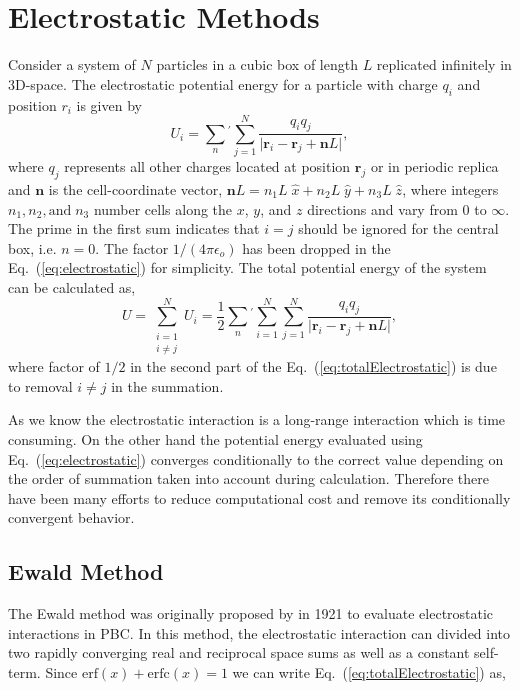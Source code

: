 \section{Electrostatic Methods}
\label{sec:ElectMethod}
Consider a system of $N$ particles in a cubic box of length $L$  replicated infinitely in 3D-space. The electrostatic potential energy for a particle with charge $q_i$ and position $r_i$ is given by
\begin{equation}
U_i =  \sum_n{}^{'}{ \sum_{j=1}^N {\frac{q_i q_j}{\lvert {\mathbf{r}_i-\mathbf{r}_j + \mathbf{n}L}\rvert}}},
\label{eq:electrostatic}
\end{equation}
where $q_j$ represents all other charges located at position $\mathbf{r}_j$ or in periodic replica and $\mathbf{n}$ is the cell-coordinate vector, $\mathbf{n}L = n_1 L \;\hat{x} + n_2 L\;\hat{y} + n_3 L\;\hat{z}$, where integers $n_1,n_2, \text{and}\; n_3$ number cells along the $x$, $y$, and $z$ directions and vary from 0 to $\infty$. The prime in the first sum indicates that $i =j $ should be ignored for the central box, i.e. $n = 0$. The factor ${1}/({4\pi\epsilon_o})$ has been dropped in the Eq.~(\ref{eq:electrostatic}) for simplicity. The total potential energy of the system can be calculated as,
\begin{equation}
U = \sum_{\substack{i=1 \\ i\neq j}}^N{U_i} = \frac{1}{2}\sum_n{}^{'}{\sum_{i=1}^N { \sum_{j=1}^N {\frac{q_i q_j}{\lvert {\mathbf{r}_i-\mathbf{r}_j + \mathbf{n}L}\rvert}}}},
\label{eq:totalElectrostatic}
\end{equation}
where factor of ${1}/{2}$ in the second part of the Eq.~(\ref{eq:totalElectrostatic}) is due to removal $i \neq j$ in the summation.
 
As we know the electrostatic interaction is a long-range interaction which is time consuming. On the other hand the potential energy evaluated using Eq.~(\ref{eq:electrostatic}) converges conditionally to the correct value depending on the order of summation taken into account during  calculation.\cite{Allen89} Therefore there have been many efforts to reduce computational cost and remove its conditionally convergent behavior.  

\subsection{Ewald Method}
The Ewald method was originally proposed by  in 1921 to evaluate electrostatic interactions in PBC. In this method, the electrostatic interaction  can divided into two rapidly converging real and reciprocal space sums as well as a constant self-term. \cite{Toukmaji96} Since  $\mathrm{erf}(x) + \mathrm{erfc}(x) = 1$ we can write Eq.~(\ref{eq:totalElectrostatic}) as,

